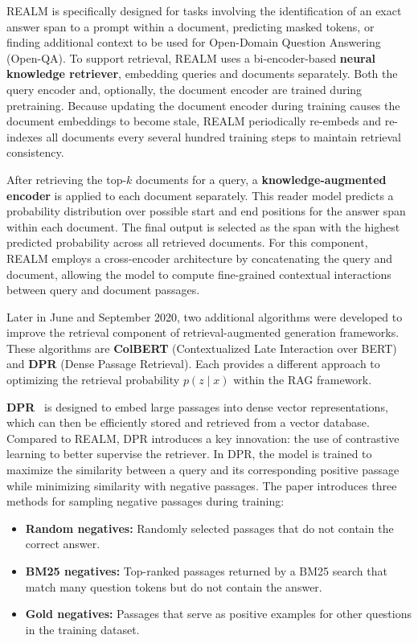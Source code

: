 \documentclass[twocolumn, 10pt]{article}
\begin{document}
REALM is specifically designed for tasks involving the identification of an exact answer span to a prompt within a document, predicting masked tokens, or finding additional context to be used for Open-Domain Question Answering (Open-QA). To support retrieval, REALM uses a bi-encoder-based \textbf{neural knowledge retriever}, embedding queries and documents separately. Both the query encoder and, optionally, the document encoder are trained during pretraining. Because updating the document encoder during training causes the document embeddings to become stale, REALM periodically re-embeds and re-indexes all documents every several hundred training steps to maintain retrieval consistency.

After retrieving the top-\(k\) documents for a query, a \textbf{knowledge-augmented encoder} is applied to each document separately. This reader model predicts a probability distribution over possible start and end positions for the answer span within each document. The final output is selected as the span with the highest predicted probability across all retrieved documents. For this component, REALM employs a cross-encoder architecture by concatenating the query and document, allowing the model to compute fine-grained contextual interactions between query and document passages.

Later in June and September 2020, two additional algorithms were developed to improve the retrieval component of retrieval-augmented generation frameworks. These algorithms are \textbf{ColBERT} (Contextualized Late Interaction over BERT) and \textbf{DPR} (Dense Passage Retrieval). Each provides a different approach to optimizing the retrieval probability \( p(z \mid x) \) within the RAG framework.

\textbf{DPR}~\cite{karpukhin2020dense} is designed to embed large passages into dense vector representations, which can then be efficiently stored and retrieved from a vector database. Compared to REALM, DPR introduces a key innovation: the use of contrastive learning to better supervise the retriever. In DPR, the model is trained to maximize the similarity between a query and its corresponding positive passage while minimizing similarity with negative passages. The paper introduces three methods for sampling negative passages during training:

\begin{itemize}
    \item \textbf{Random negatives:} Randomly selected passages that do not contain the correct answer.
    \item \textbf{BM25 negatives:} Top-ranked passages returned by a BM25 search that match many question tokens but do not contain the answer.
    \item \textbf{Gold negatives:} Passages that serve as positive examples for other questions in the training dataset.
\end{itemize}
\end{document}
